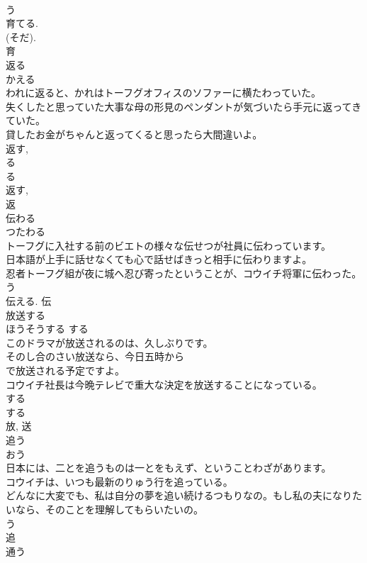 \documentclass[8pt]{extreport}
\begin{document}
\begin{CJK}{UTF8}{min}
\\	う 
\\	育てる. 
\\	(そだ). 
\\	育	
\\	返る	
\\	かえる	
\\	われに返ると、かれはトーフグオフィスのソファーに横たわっていた。	
\\	失くしたと思っていた大事な母の形見のペンダントが気づいたら手元に返ってきていた。	
\\	貸したお金がちゃんと返ってくると思ったら大間違いよ。	
\\	返す, 
\\	る 
\\	る 
\\	返す, 
\\	返	
\\	伝わる	
\\	つたわる	
\\	トーフグに入社する前のビエトの様々な伝せつが社員に伝わっています。	
\\	日本語が上手に話せなくても心で話せばきっと相手に伝わりますよ。	
\\	忍者トーフグ組が夜に城へ忍び寄ったということが、コウイチ将軍に伝わった。	
\\	う 
\\	伝える.	伝	
\\	放送する	
\\	ほうそうする	する 
\\	このドラマが放送されるのは、久しぶりです。	
\\	そのし合のさい放送なら、今日五時から
\\	で放送される予定ですよ。	
\\	コウイチ社長は今晩テレビで重大な決定を放送することになっている。	
\\	する 
\\	する 
\\	放, 送	
\\	追う	
\\	おう	
\\	日本には、二とを追うものは一とをもえず、ということわざがあります。	
\\	コウイチは、いつも最新のりゅう行を追っている。	
\\	どんなに大変でも、私は自分の夢を追い続けるつもりなの。もし私の夫になりたいなら、そのことを理解してもらいたいの。	
\\	う 
\\	追	
\\	通う	

\end{CJK}
\end{document}
